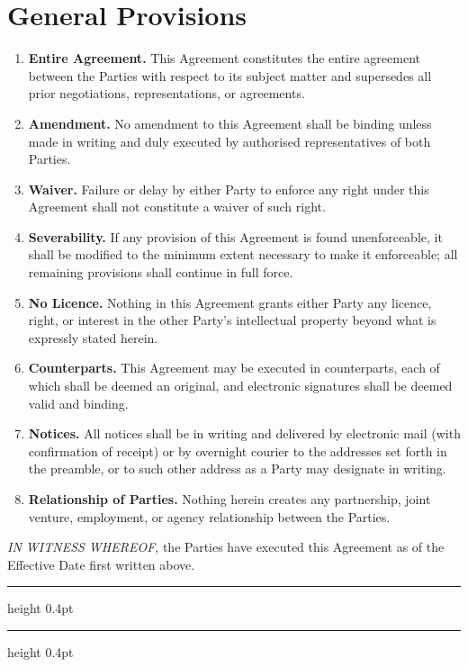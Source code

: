 \section{General Provisions}

\begin{enumerate}
  \item \textbf{Entire Agreement.} This Agreement constitutes the entire
        agreement between the Parties with respect to its subject matter and
        supersedes all prior negotiations, representations, or agreements.
  \item \textbf{Amendment.} No amendment to this Agreement shall be binding
        unless made in writing and duly executed by authorised representatives
        of both Parties.
  \item \textbf{Waiver.} Failure or delay by either Party to enforce any right
        under this Agreement shall not constitute a waiver of such right.
  \item \textbf{Severability.} If any provision of this Agreement is found
        unenforceable, it shall be modified to the minimum extent necessary to
        make it enforceable; all remaining provisions shall continue in full force.
  \item \textbf{No Licence.} Nothing in this Agreement grants either Party any
        licence, right, or interest in the other Party's intellectual property
        beyond what is expressly stated herein.
  \item \textbf{Counterparts.} This Agreement may be executed in counterparts,
        each of which shall be deemed an original, and electronic signatures
        shall be deemed valid and binding.
  \item \textbf{Notices.} All notices shall be in writing and delivered by
        electronic mail (with confirmation of receipt) or by overnight courier
        to the addresses set forth in the preamble, or to such other address as
        a Party may designate in writing.
  \item \textbf{Relationship of Parties.} Nothing herein creates any partnership,
        joint venture, employment, or agency relationship between the Parties.
\end{enumerate}

\vspace{16pt}
\noindent
\textit{IN WITNESS WHEREOF}, the Parties have executed this Agreement as of the
Effective Date first written above.

\vspace{22pt}

\noindent
{}%
\hfill
{}

\vspace{30pt}
{\color{rulegray}\hrule height 0.4pt}
{\color{rulegray}\hrule height 0.4pt}
\vspace{2pt}
